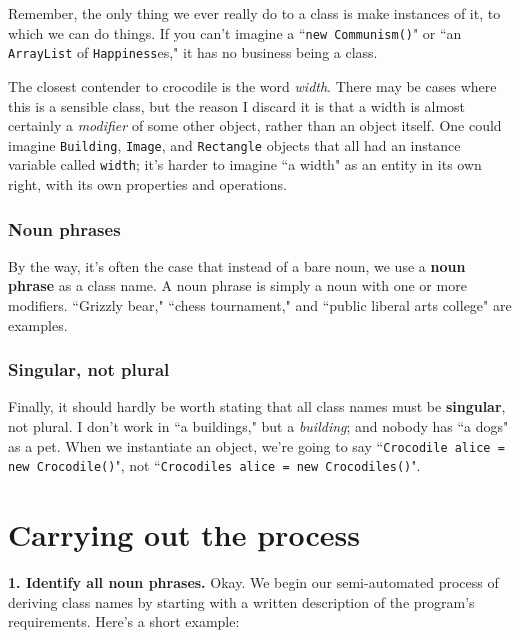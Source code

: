 Remember, the only thing we ever really do to a class is make instances of it,
to which we can do things. If you can't imagine a ``\texttt{new Communism()}"
or ``an \texttt{ArrayList} of \texttt{Happiness}es," it has no business being
a class.

The closest contender to crocodile is the word \textit{width}. There may be
cases where this is a sensible class, but the reason I discard it is that a
width is almost certainly a \textit{modifier} of some other object, rather
than an object itself. One could imagine \texttt{Building}, \texttt{Image},
and \texttt{Rectangle} objects that all had an instance variable called
\texttt{width}; it's harder to imagine ``a width" as an entity in its own
right, with its own properties and operations.

\subsubsection{Noun phrases}

By the way, it's often the case that instead of a bare noun, we use a
\textbf{noun phrase} as a class name. A noun phrase is simply a noun with one
or more modifiers. ``Grizzly bear," ``chess tournament," and ``public liberal
arts college" are examples.

\subsubsection{Singular, not plural}

Finally, it should hardly be worth stating that all class names must be
\textbf{singular}, not plural. I don't work in ``a buildings," but a
\textit{building}; and nobody has ``a dogs" as a pet. When we instantiate an
object, we're going to say ``\texttt{Crocodile alice = new Crocodile()}", not 
``\texttt{Crocodiles alice = new Crocodiles()}".

\section{Carrying out the process}

\textbf{1. Identify all noun phrases.} Okay. We begin our semi-automated
process of deriving class names by starting with a written description of the
program's requirements. Here's a short example:

\setlength{\fboxsep}{10pt}
\begin{center}
\label{blockRequirements1}
\large
{}
\end{center}

